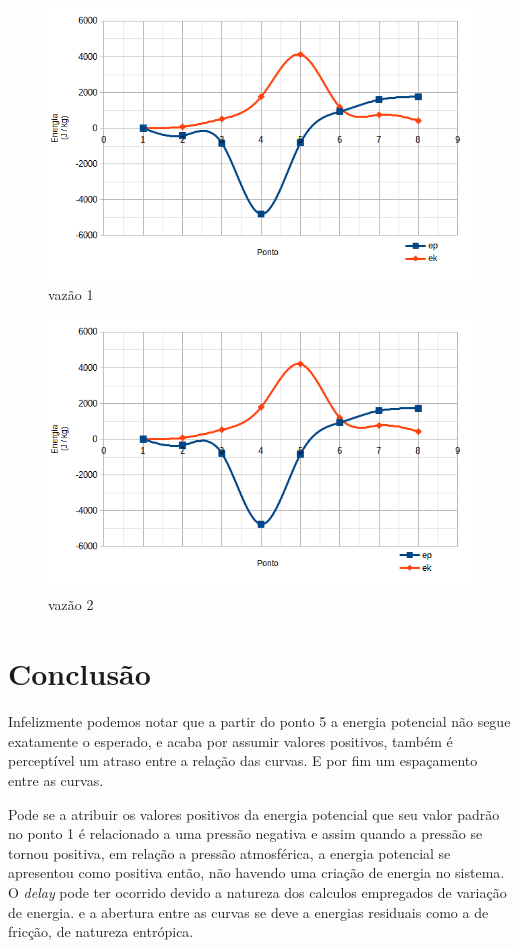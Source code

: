 \documentclass[12pt, twoside, a4]{article}
\begin{document}
\begin{figure}[H]
    \caption{vazão 1}
    \includegraphics[scale = 0.60]{vent1.png}
\end{figure}

\begin{figure}[H]
    \caption{vazão 2}
    \includegraphics[scale = 0.60]{vent2.png}
\end{figure}



\section{Conclusão}

\tab Infelizmente podemos notar que a partir do ponto 5 a energia potencial não segue exatamente
o esperado, e acaba por assumir valores positivos, também é perceptível um atraso entre a relação das curvas.
E por fim um espaçamento entre as curvas.

Pode se a atribuir os valores positivos da energia potencial que seu valor padrão no ponto 1 é relacionado a uma
pressão negativa e assim quando a pressão se tornou positiva, em relação a pressão atmosférica, a energia potencial
se apresentou como positiva então, não havendo uma criação de energia no sistema. O \emph{delay} pode ter ocorrido
devido a natureza dos calculos empregados de variação de energia. e a abertura entre as curvas se deve a energias 
residuais como a de fricção, de natureza entrópica.
\end{document}
